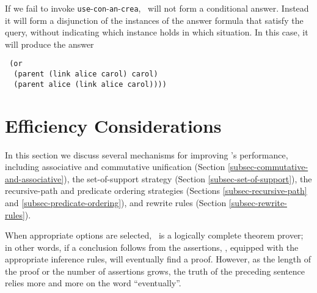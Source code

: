 If we fail to invoke {\tt use}-{\tt con}-{\tt an}-{\tt crea}, \snark\  will not form
a conditional answer.  Instead it will form a disjunction of the
instances of the answer formula that satisfy the query, without
indicating which instance holds in which situation.  In this case, it
will produce the answer
\begin{verbatim}
 (or
  (parent (link alice carol) carol)
  (parent alice (link alice carol))))
\end{verbatim}

\section{Efficiency Considerations}
\label{sec-efficiency-considerations}

In this section we discuss several mechanisms for improving \snark\/'s
performance, including associative and commutative unification
(Section \ref{subsec-commutative-and-associative}), the set-of-support
strategy (Section \ref{subsec-set-of-support}), the recursive-path and
predicate ordering strategies (Sections \ref{subsec-recursive-path}
and \ref{subsec-predicate-ordering}), and rewrite rules (Section
\ref{subsec-rewrite-rules}).


When appropriate options are selected, \Snark\  is a logically complete
theorem prover; in other words, if a conclusion follows from the
assertions, \snark\/, equipped with the appropriate inference rules,
will eventually find a proof.  However, as the length of the proof or
the number of assertions grows, the truth of the preceding sentence
relies more and more on the word ``eventually''.

